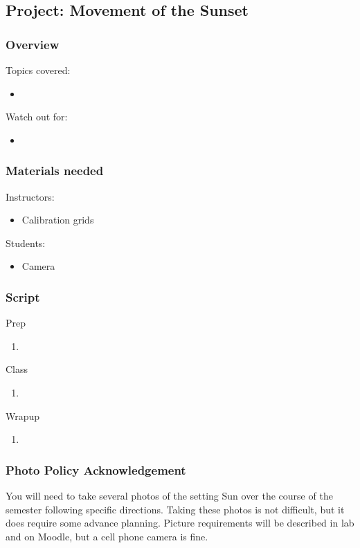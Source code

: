 \documentclass[12pt]{article}
\begin{document}
\newpage
\subsection{Project: Movement of the Sunset}
\subsubsection{Overview}
Topics covered:
\begin{itemize}
\item 
\end{itemize}
Watch out for:
\begin{itemize}
\item 
\end{itemize}

\subsubsection{Materials needed}
Instructors:
\begin{itemize}
  \item Calibration grids
\end{itemize}
Students:
\begin{itemize}
  \item Camera
\end{itemize}

\subsubsection{Script}
Prep
\begin{enumerate}
\item
\end{enumerate}
Class
\begin{enumerate}
\item
\end{enumerate}
Wrapup
\begin{enumerate}
\item
\end{enumerate}

\subsubsection{Photo Policy Acknowledgement}
You will need to take several photos of the setting Sun over the course of the semester following specific directions. Taking these photos is not difficult, but it does require some advance planning. Picture requirements will be described in lab and on Moodle, but a cell phone camera is fine.
\end{document}
